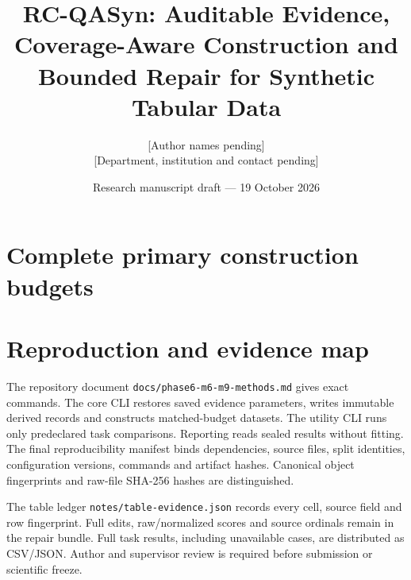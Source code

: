 \documentclass[11pt]{article}
\title{RC-QASyn: Auditable Evidence, Coverage-Aware Construction and Bounded Repair for Synthetic Tabular Data}
\author{[Author names pending]\\[0.3em]\small [Department, institution and contact pending]}
\date{Research manuscript draft --- 19 October 2026}
\begin{document}
\maketitle






\appendix
\section{Complete primary construction budgets}
\small\normalsize
\section{Reproduction and evidence map}
The repository document \texttt{docs/phase6-m6-m9-methods.md} gives exact commands. The core CLI restores saved evidence parameters, writes immutable derived records and constructs matched-budget datasets. The utility CLI runs only predeclared task comparisons. Reporting reads sealed results without fitting. The final reproducibility manifest binds dependencies, source files, split identities, configuration versions, commands and artifact hashes. Canonical object fingerprints and raw-file SHA-256 hashes are distinguished.

The table ledger \texttt{notes/table-evidence.json} records every cell, source field and row fingerprint. Full edits, raw/normalized scores and source ordinals remain in the repair bundle. Full task results, including unavailable cases, are distributed as CSV/JSON. Author and supervisor review is required before submission or scientific freeze.
\end{document}

